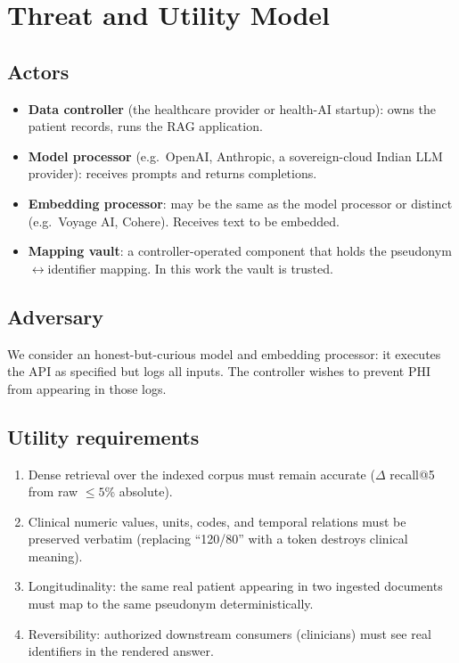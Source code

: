 \documentclass[11pt,a4paper]{article}
\begin{document}
\section{Threat and Utility Model}

\subsection{Actors}

\begin{itemize}
  \item \textbf{Data controller} (the healthcare provider or health-AI
        startup): owns the patient records, runs the RAG application.
  \item \textbf{Model processor} (e.g.\ OpenAI, Anthropic, a sovereign-cloud
        Indian LLM provider): receives prompts and returns completions.
  \item \textbf{Embedding processor}: may be the same as the model processor
        or distinct (e.g.\ Voyage AI, Cohere). Receives text to be embedded.
  \item \textbf{Mapping vault}: a controller-operated component that holds
        the pseudonym$\leftrightarrow$identifier mapping. In this work the
        vault is trusted.
\end{itemize}

\subsection{Adversary}

We consider an honest-but-curious model and embedding processor: it executes
the API as specified but logs all inputs. The controller wishes to prevent
PHI from appearing in those logs.

\subsection{Utility requirements}

\begin{enumerate}
  \item Dense retrieval over the indexed corpus must remain accurate
        ($\Delta$ recall@5 from raw $\leq 5$\% absolute).
  \item Clinical numeric values, units, codes, and temporal relations must
        be preserved verbatim (replacing ``120/80'' with a token destroys
        clinical meaning).
  \item Longitudinality: the same real patient appearing in two ingested
        documents must map to the same pseudonym deterministically.
  \item Reversibility: authorized downstream consumers (clinicians) must
        see real identifiers in the rendered answer.
\end{enumerate}
\end{document}
